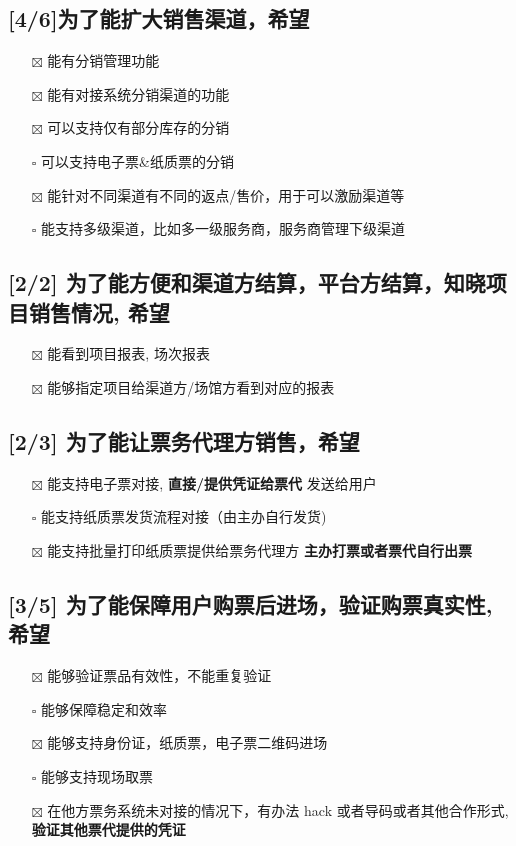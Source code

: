 \documentclass[11pt,a4paper]{article}
\begin{document}
\subsection*{[4/6]为了能扩大销售渠道，希望}
\label{sec:org58c9504}
\begin{itemize}
\item[{$\boxtimes$}] 能有分销管理功能
\item[{$\boxtimes$}] 能有对接系统分销渠道的功能
\item[{$\boxtimes$}] 可以支持仅有部分库存的分销
\item[{$\square$}] 可以支持电子票\&纸质票的分销
\item[{$\boxtimes$}] 能针对不同渠道有不同的返点/售价，用于可以激励渠道等
\item[{$\square$}] 能支持多级渠道，比如多一级服务商，服务商管理下级渠道
\end{itemize}
\subsection*{[2/2] 为了能方便和渠道方结算，平台方结算，知晓项目销售情况, 希望}
\label{sec:orge6d14f3}
\begin{itemize}
\item[{$\boxtimes$}] 能看到项目报表, 场次报表
\item[{$\boxtimes$}] 能够指定项目给渠道方/场馆方看到对应的报表
\end{itemize}
\subsection*{[2/3] 为了能让票务代理方销售，希望}
\label{sec:org0284e0c}
\begin{itemize}
\item[{$\boxtimes$}] 能支持电子票对接, \textbf{直接/提供凭证给票代} 发送给用户
\item[{$\square$}] 能支持纸质票发货流程对接（由主办自行发货)
\item[{$\boxtimes$}] 能支持批量打印纸质票提供给票务代理方 \textbf{主办打票或者票代自行出票}
\end{itemize}
\subsection*{[3/5] 为了能保障用户购票后进场，验证购票真实性, 希望}
\label{sec:org81a6223}
\begin{itemize}
\item[{$\boxtimes$}] 能够验证票品有效性，不能重复验证
\item[{$\square$}] 能够保障稳定和效率
\item[{$\boxtimes$}] 能够支持身份证，纸质票，电子票二维码进场
\item[{$\square$}] 能够支持现场取票
\item[{$\boxtimes$}] 在他方票务系统未对接的情况下，有办法 hack 或者导码或者其他合作形式, \textbf{验证其他票代提供的凭证}
\end{itemize}
\end{document}
